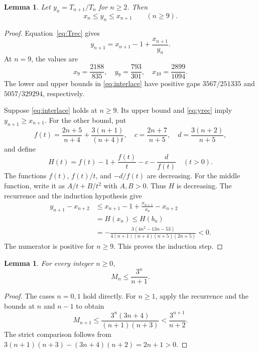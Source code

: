 \documentclass[11pt]{article}
\newtheorem{lemma}[theorem]{Lemma}
\begin{document}
\begin{lemma}\label{lem:interlace}
Let $y_n=T_{n+1}/T_n$ for $n\ge2$. Then
\begin{equation}\label{eq:interlace}
x_n\le y_n\le x_{n+1}\qquad(n\ge9).
\end{equation}
\end{lemma}

\begin{proof}
Equation~\eqref{eq:Trec} gives
\begin{equation}\label{eq:yrec}
y_{n+1}=x_{n+1}-1+\frac{x_{n+1}}{y_n}.
\end{equation}
At $n=9$, the values are
\[
x_9=\frac{2188}{835},\quad y_9=\frac{793}{301},\quad
x_{10}=\frac{2899}{1094}.
\]
The lower and upper bounds in \eqref{eq:interlace} have positive gaps
$3567/251335$ and $5057/329294$, respectively.

Suppose \eqref{eq:interlace} holds at $n\ge9$.
Its upper bound and \eqref{eq:yrec} imply $y_{n+1}\ge x_{n+1}$.
For the other bound, put
\[
f(t)=\frac{2n+5}{n+4}+\frac{3(n+1)}{(n+4)t},\quad
c=\frac{2n+7}{n+5},\quad d=\frac{3(n+2)}{n+5},
\]
and define
\[
H(t)=f(t)-1+\frac{f(t)}t-c-\frac d{f(t)}\quad(t>0).
\]
The functions $f(t)$, $f(t)/t$, and $-d/f(t)$ are decreasing.
For the middle function, write it as $A/t+B/t^2$ with $A,B>0$.
Thus $H$ is decreasing. The recurrence and the induction hypothesis give
\begin{align*}
y_{n+1}-x_{n+2}
&\le x_{n+1}-1+\frac{x_{n+1}}{x_n}-x_{n+2}\\
&=H(x_n)\le H(b_n)\\
&=-\frac{3(4n^2-13n-53)}{4(n+1)(n+4)(n+5)(2n+5)}<0.
\end{align*}
The numerator is positive for $n\ge9$.
This proves the induction step.
\end{proof}

\begin{lemma}\label{lem:size}
For every integer $n\ge0$,
\begin{equation}\label{eq:size}
M_n\le\frac{3^n}{n+1}.
\end{equation}
\end{lemma}

\begin{proof}
The cases $n=0,1$ hold directly. For $n\ge1$, apply the recurrence and
the bounds at $n$ and $n-1$ to obtain
\[
M_{n+1}\le\frac{3^n(3n+4)}{(n+1)(n+3)}
<\frac{3^{n+1}}{n+2}.
\]
The strict comparison follows from
$3(n+1)(n+3)-(3n+4)(n+2)=2n+1>0$.
\end{proof}
\end{document}
